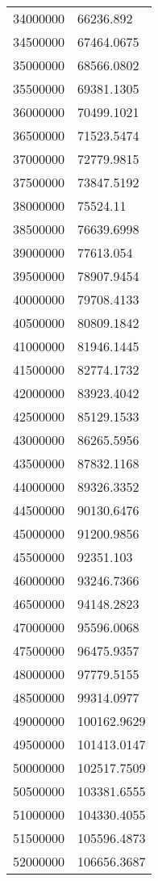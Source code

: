 \documentclass{article}
\begin{document}
\begin{longtable}[c]{ll}
34000000       & 66236.892   \\
34500000       & 67464.0675  \\
35000000       & 68566.0802  \\
35500000       & 69381.1305  \\
36000000       & 70499.1021  \\
36500000       & 71523.5474  \\
37000000       & 72779.9815  \\
37500000       & 73847.5192  \\
38000000       & 75524.11    \\
38500000       & 76639.6998  \\
39000000       & 77613.054   \\
39500000       & 78907.9454  \\
40000000       & 79708.4133  \\
40500000       & 80809.1842  \\
41000000       & 81946.1445  \\
41500000       & 82774.1732  \\
42000000       & 83923.4042  \\
42500000       & 85129.1533  \\
43000000       & 86265.5956  \\
43500000       & 87832.1168  \\
44000000       & 89326.3352  \\
44500000       & 90130.6476  \\
45000000       & 91200.9856  \\
45500000       & 92351.103   \\
46000000       & 93246.7366  \\
46500000       & 94148.2823  \\
47000000       & 95596.0068  \\
47500000       & 96475.9357  \\
48000000       & 97779.5155  \\
48500000       & 99314.0977  \\
49000000       & 100162.9629 \\
49500000       & 101413.0147 \\
50000000       & 102517.7509 \\
50500000       & 103381.6555 \\
51000000       & 104330.4055 \\
51500000       & 105596.4873 \\
52000000       & 106656.3687 \\

\end{longtable}
\end{document}
